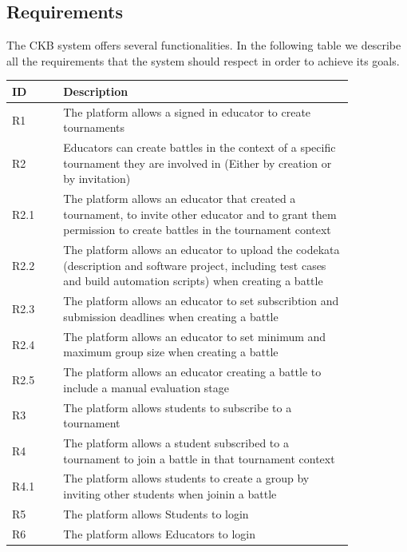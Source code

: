 \subsection{Requirements}
The \ac{CKB} system offers several functionalities. In the following table we describe all the requirements that the system should respect in order to achieve its goals.
\begin{center}
    \begin{longtable}{ |l|p{0.85\linewidth}| }
        \hline
            \textbf{ID} & \textbf{Description}\\
        \hline
            R1 & The platform allows a signed in educator to create tournaments \\
        \hline
            R2 & Educators can create battles in the context of a specific tournament they are involved in (Either by creation or by invitation)  \\
        \hline
            R2.1 & The platform allows an educator that created a tournament, to invite other educator and to grant them permission to create battles in the tournament context \\
        \hline
            R2.2 & The platform allows an educator to upload the codekata (description and software project, including test cases and build automation scripts) when creating a battle \\
        \hline
            R2.3 & The platform allows an educator to set subscribtion and submission deadlines when creating a battle \\
        \hline
            R2.4 & The platform allows an educator to set minimum and maximum group size when creating a battle \\
        \hline
            R2.5 & The platform allows an educator creating a battle to include a manual evaluation stage \\
        \hline
            R3 & The platform allows students to subscribe to a tournament \\
        \hline
            R4 & The platform allows a student subscribed to a tournament to join a battle in that tournament context \\
        \hline
            R4.1 & The platform allows students to create a group by inviting other students when joinin a battle \\
        \hline
            R5 & The platform allows Students to login \\
        \hline
            R6 & The platform allows Educators to login  \\

\end{longtable}
\end{center}

